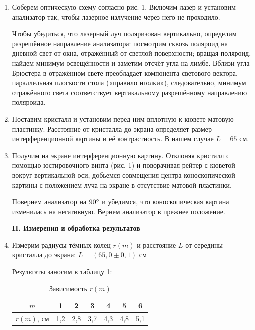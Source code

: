\documentclass[a4paper,12pt]{article} %
\begin{document}
	\begin{enumerate}
		\item Соберем оптическую схему согласно рис. 1. Включим лазер и установим анализатор так, чтобы лазерное излучение через него не проходило. 
		
		Чтобы убедиться, что лазерный луч поляризован вертикально, определим разрешённое направление анализатора: посмотрим сквозь поляроид на дневной свет от окна, отражённый от светлой поверхности; вращая поляроид, найдем минимум освещённости и заметим отсчёт угла на лимбе. Вблизи угла Брюстера в отражённом свете преобладает компонента светового вектора, параллельная плоскости стола («правило иголки»), следовательно, минимум отражённого света соответствует вертикальному разрешённому направлению поляроида.
		
		
		\item Поставим кристалл и установим перед ним вплотную к кювете матовую пластинку. Расстояние от кристалла до экрана определяет размер интерференционной картины и её контрастность. В нашем случае $L = 65$ см.
		
		\item Получим на экране интерференционную картину. Отклоняя кристалл с помощью юстировочного винта (рис. 1) и поворачивая рейтер с кюветой вокруг вертикальной оси, добьемся совмещения центра коноскопической картины с положением луча на экране в отсутствие матовой пластинки.
	
		Повернем анализатор на $90\degree$ и убедимся, что коноскопическая картина изменилась на негативную. Вернем анализатор в прежнее положение.

		\begin{center}
			\textbf{II. Измерения и обработка результатов}
		\end{center}
	
		\item Измерим радиусы тёмных колец $r(m)$ и расстояние $L$ от середины кристалла до экрана: $\boxed{L = (65,0 \pm 0,1) \text{ см}}$
		
		Результаты заносим в таблицу 1:
		\begin{table}[h!]
			\centering
			\begin{tabular}{|c|c|c|c|c|c|c|}
				\hline
				$m$        & 1   & 2   & 3   & 4   & 5   & 6   \\ \hline
				$r(m)$, см & 1,2 & 2,8 & 3,7 & 4,3 & 4,8 & 5,1 \\ \hline
			\end{tabular}
			\caption{Зависимость $r(m)$}
		\end{table}		
	

\end{enumerate}
\end{document}
